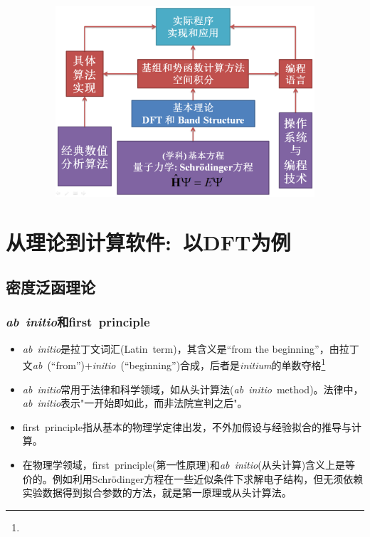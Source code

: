 \frame
{
\begin{figure}[h!]
\vspace*{-0.25in}
\centering
\includegraphics[height=2.80in,width=4.95in,viewport=5 3 1250 780,clip]{Figures/Method_Procedure.png}
\label{Method-Procedure}
\end{figure}
}

\section{从理论到计算软件:~以\rm{DFT}为例}       %
\subsection{密度泛函理论}       %
\frame
{
	\frametitle{\textit{ab~initio}和\textrm{first~principle}}
	\begin{itemize}
		\item \textit{ab~initio}是拉丁文词汇\textrm{(Latin~term)}，其含义是\textrm{``from the beginning''}，由拉丁文\textit{ab}~\textrm{(``from'')}+\textit{initio}~\textrm{(``beginning'')}合成，后者是\textit{initium}的单数夺格\footnote{\fontsize{5.5pt}{4.2pt}}
		\item \textit{ab~initio}常用于法律和科学领域，如从头计算法(\textit{ab~initio}~\textrm{method})。法律中，\textit{ab~initio}表示"一开始即如此，而非法院宣判之后"。
		\item \textrm{first~principle}指从基本的物理学定律出发，不外加假设与经验拟合的推导与计算。
		\item 在物理学领域，\textrm{first~principle}(第一性原理)和\textit{ab~initio}(从头计算)含义上是等价的。例如利用\textrm{Schr\"odinger}方程在一些近似条件下求解电子结构，但无须依赖实验数据得到拟合参数的方法，就是第一原理或从头计算法。
	\end{itemize}
}


